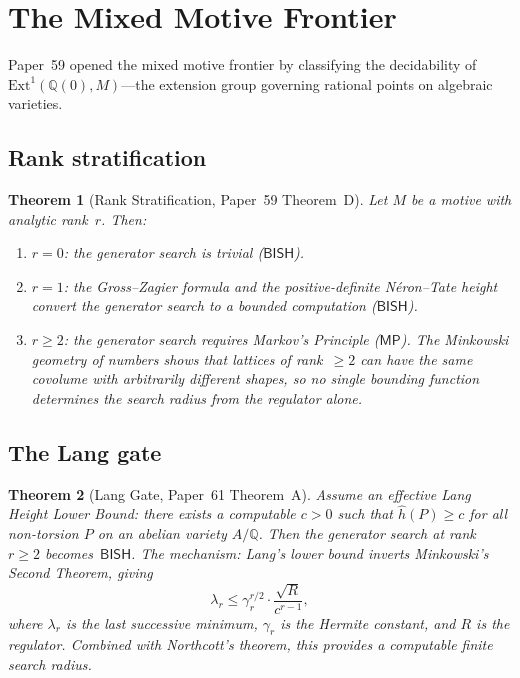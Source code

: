\documentclass[11pt]{article}
\theoremstyle{plain}
\newtheorem{theorem}{Theorem}[section]
\theoremstyle{definition}
\theoremstyle{remark}
\newcommand{\Q}{\mathbb{Q}}
\newcommand{\Ext}{\mathrm{Ext}}
\newcommand{\BISH}{\mathsf{BISH}}
\newcommand{\MP}{\mathsf{MP}}
\begin{document}
\section{The Mixed Motive Frontier}\label{sec:mixed}

Paper~59 opened the mixed motive frontier by classifying the
decidability of $\Ext^1(\Q(0), M)$---the extension group governing
rational points on algebraic varieties.

\subsection{Rank stratification}

\begin{theorem}[Rank Stratification,
  Paper~59 Theorem~D]\label{thm:rank}
Let $M$ be a motive with analytic rank~$r$.  Then:
\begin{enumerate}[label=(\roman*)]
\item $r = 0$: the generator search is trivial ($\BISH$).
\item $r = 1$: the Gross--Zagier formula and the positive-definite
  N\'eron--Tate height convert the generator search to a bounded
  computation ($\BISH$).
\item $r \ge 2$: the generator search requires Markov's Principle
  ($\MP$).  The Minkowski geometry of numbers shows that
  lattices of rank~$\ge 2$ can have the same covolume with
  arbitrarily different shapes, so no single bounding function
  determines the search radius from the regulator alone.
\end{enumerate}
\end{theorem}

\subsection{The Lang gate}

\begin{theorem}[Lang Gate, Paper~61 Theorem~A]\label{thm:lang}
Assume an effective Lang Height Lower Bound: there exists a
computable $c > 0$ such that $\hat{h}(P) \ge c$ for all
non-torsion $P$ on an abelian variety $A/\Q$.  Then the
generator search at rank~$r \ge 2$ becomes~$\BISH$.  The
mechanism: Lang's lower bound inverts Minkowski's Second Theorem,
giving
\[
  \lambda_r \le \gamma_r^{r/2} \cdot \frac{\sqrt{R}}{c^{r-1}},
\]
where $\lambda_r$ is the last successive minimum, $\gamma_r$ is
the Hermite constant, and $R$ is the regulator.  Combined with
Northcott's theorem, this provides a computable finite search
radius.
\end{theorem}
\end{document}
